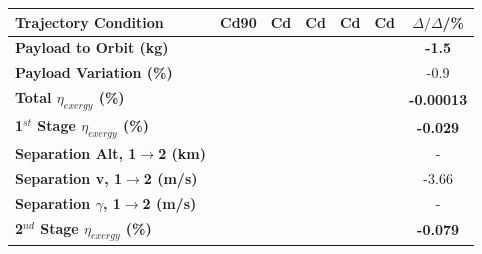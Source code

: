 \begin{table}[ht]
	\centering
\begin{tabular}{l c c c c c c} 
	\hline \textbf{Trajectory Condition}
	&Cd90
	&Cd
	&Cd
	&Cd
	&Cd
	& $\Delta/\Delta$/\%
	\\
	\hline \textbf{Payload to Orbit (kg)}
	& \textbf{\PayloadToOrbitCdNinety}
	& \textbf{\PayloadToOrbitCdNinetyFive}
	& \textbf{\PayloadToOrbitCdStandard}
	& \textbf{\PayloadToOrbitCdOneHundredFive}
	& \textbf{\PayloadToOrbitCdOneHundredTen}
	&\textbf{-1.5}
	\\
	\textbf{Payload Variation (\%)}
	& \PayloadVarCdNinety
	& \PayloadVarCdNinetyFive
	& \PayloadVarCdStandard
	& \PayloadVarCdOneHundredFive
	& \PayloadVarCdOneHundredTen
	&-0.9
	\\
	\textbf{Total $\eta_{exergy}$ (\%)}
	& \textbf{\totalExergyEffCdNinety}
	& \textbf{\totalExergyEffCdNinetyFive}
	& \textbf{\totalExergyEffCdStandard}
	& \textbf{\totalExergyEffCdOneHundredFive}
	& \textbf{\totalExergyEffCdOneHundredTen}
	& \textbf{-0.00013}
	\\
	\hline 
	\textbf{1$^{st}$ Stage $\eta_{exergy}$ (\%)}
	& \textbf{\firstExergyEffCdNinety}
	& \textbf{\firstExergyEffCdNinetyFive}
	& \textbf{\firstExergyEffCdStandard}
	& \textbf{\firstExergyEffCdOneHundredFive}
	& \textbf{\firstExergyEffCdOneHundredTen}
	& \textbf{-0.029}
	\\
	\textbf{Separation Alt, 1$\rightarrow$2 (km)}
	& \firstsecondSeparationAltCdNinety
	& \firstsecondSeparationAltCdNinetyFive
	& \firstsecondSeparationAltCdStandard
	& \firstsecondSeparationAltCdOneHundredFive
	& \firstsecondSeparationAltCdOneHundredTen
	& -
	\\
	\textbf{Separation v, 1$\rightarrow$2 (m/s)}
	& \firstsecondSeparationvCdNinety
	& \firstsecondSeparationvCdNinetyFive
	& \firstsecondSeparationvCdStandard
	& \firstsecondSeparationvCdOneHundredFive
	& \firstsecondSeparationvCdOneHundredTen
	&-3.66
	\\
	\textbf{Separation $\gamma$, 1$\rightarrow$2 (m/s)}
	& \firstsecondSeparationgammaCdNinety
	& \firstsecondSeparationgammaCdNinetyFive
	& \firstsecondSeparationgammaCdStandard
	& \firstsecondSeparationgammaCdOneHundredFive
	& \firstsecondSeparationgammaCdOneHundredTen
	& -
	\\
	\hline 
	\textbf{2$^{nd}$ Stage $\eta_{exergy}$ (\%)}
	& \textbf{\secondExergyEffCdNinety}
	& \textbf{\secondExergyEffCdNinetyFive}
	& \textbf{\secondExergyEffCdStandard}
	& \textbf{\secondExergyEffCdOneHundredFive}
	& \textbf{\secondExergyEffCdOneHundredTen}
	& \textbf{-0.079}

\end{tabular}
\end{table}
